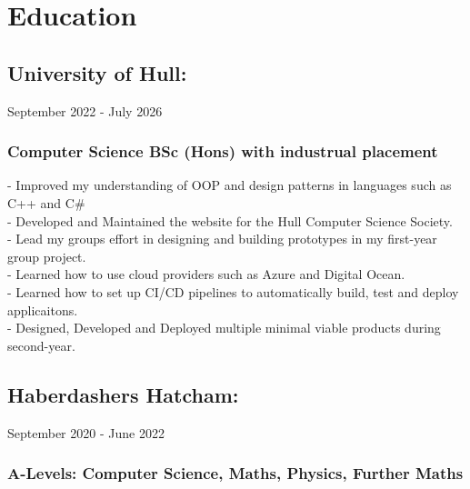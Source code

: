 \section{Education}

\subsection{University of Hull:} September 2022 - July 2026 \\

\subsubsection{Computer Science BSc (Hons) with industrual placement}

-\: Improved my understanding of OOP and design patterns in languages such as C++ and C\#\\
-\: Developed and Maintained the website for the Hull Computer Science Society. \\
-\: Lead my groups effort in designing and building prototypes in my first-year group project. \\ 
-\: Learned how to use cloud providers such as Azure and Digital Ocean. \\
-\: Learned how to set up CI/CD pipelines to automatically build, test and deploy applicaitons. \\
-\: Designed, Developed and Deployed multiple minimal viable products during second-year. 

\vspace{10pt}
\subsection{Haberdashers Hatcham:} September 2020 - June 2022 \\ 

\subsubsection{A-Levels: Computer Science, Maths, Physics, Further Maths}
